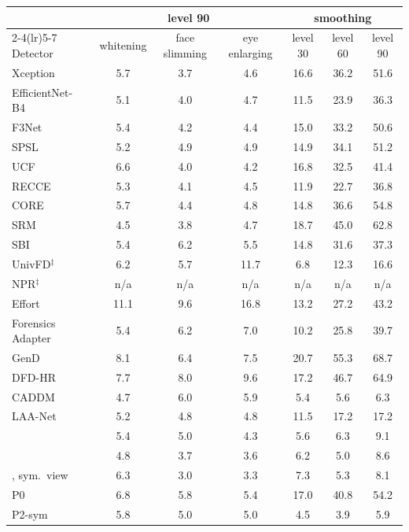 \begin{tabular}{@{}l ccc ccc@{}}
\toprule
 & \multicolumn{3}{c}{level 90} & \multicolumn{3}{c}{smoothing} \\
\cmidrule(lr){2-4}\cmidrule(lr){5-7}
Detector & whitening & face slimming & eye enlarging & level 30 & level 60 & level 90 \\
\midrule
Xception~\cite{xception} & 5.7 & 3.7 & 4.6 & 16.6 & 36.2 & 51.6 \\
EfficientNet-B4~\cite{efficientnet} & 5.1 & 4.0 & 4.7 & 11.5 & 23.9 & 36.3 \\
F3Net~\cite{f3net} & 5.4 & 4.2 & 4.4 & 15.0 & 33.2 & 50.6 \\
SPSL~\cite{spsl} & 5.2 & 4.9 & 4.9 & 14.9 & 34.1 & 51.2 \\
UCF~\cite{ucf} & 6.6 & 4.0 & 4.2 & 16.8 & 32.5 & 41.4 \\
RECCE~\cite{recce} & 5.3 & 4.1 & 4.5 & 11.9 & 22.7 & 36.8 \\
CORE~\cite{core} & 5.7 & 4.4 & 4.8 & 14.8 & 36.6 & 54.8 \\
SRM~\cite{srm} & 4.5 & 3.8 & 4.7 & 18.7 & 45.0 & 62.8 \\
SBI~\cite{sbi} & 5.4 & 6.2 & 5.5 & 14.8 & 31.6 & 37.3 \\
UnivFD$^\ddagger$~\cite{univfd} & 6.2 & 5.7 & 11.7 & 6.8 & 12.3 & 16.6 \\
NPR$^\ddagger$~\cite{npr} & n/a & n/a & n/a & n/a & n/a & n/a \\
Effort~\cite{effort} & 11.1 & 9.6 & 16.8 & 13.2 & 27.2 & 43.2 \\
Forensics Adapter~\cite{forensicsadapter} & 5.4 & 6.2 & 7.0 & 10.2 & 25.8 & 39.7 \\
GenD~\cite{gend2026} & 8.1 & 6.4 & 7.5 & 20.7 & 55.3 & 68.7 \\
DFD-HR~\cite{dfdhr2026} & 7.7 & 8.0 & 9.6 & 17.2 & 46.7 & 64.9 \\
CADDM~\cite{caddm} & 4.7 & 6.0 & 5.9 & 5.4 & 5.6 & 6.3 \\
LAA-Net~\cite{laanet} & 5.2 & 4.8 & 4.8 & 11.5 & 17.2 & 17.2 \\
\midrule
\oursB{} & 5.4 & 5.0 & 4.3 & 5.6 & 6.3 & 9.1 \\
\oursF{} & 4.8 & 3.7 & 3.6 & 6.2 & 5.0 & 8.6 \\
\oursF{}, sym.\ view & 6.3 & 3.0 & 3.3 & 7.3 & 5.3 & 8.1 \\
P0 & 6.8 & 5.8 & 5.4 & 17.0 & 40.8 & 54.2 \\
P2-sym & 5.8 & 5.0 & 5.0 & 4.5 & 3.9 & 5.9 \\
\bottomrule
\end{tabular}
